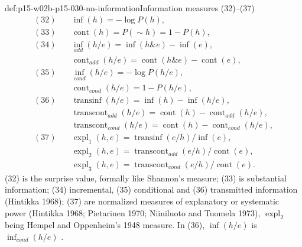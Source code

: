 \begin{hbdefinition}{def:p15-w02b-p15-030-nn-information}{Information measures (32)--(37)}
\[
\begin{aligned}
 (32)\quad&\operatorname{inf}(h)=-\log P(h),\\
 (33)\quad&\operatorname{cont}(h)=P(\sim h)=1-P(h),\\
 (34)\quad&\operatorname{inf}_{add}(h/e)=\operatorname{inf}(h\&e)-\operatorname{inf}(e),\\
          &\operatorname{cont}_{add}(h/e)=\operatorname{cont}(h\&e)-\operatorname{cont}(e),\\
 (35)\quad&\operatorname{inf}_{cond}(h/e)=-\log P(h/e),\\
          &\operatorname{cont}_{cond}(h/e)=1-P(h/e),\\
 (36)\quad&\operatorname{transinf}(h/e)=\operatorname{inf}(h)-\operatorname{inf}(h/e),\\
          &\operatorname{transcont}_{add}(h/e)=\operatorname{cont}(h)-\operatorname{cont}_{add}(h/e),\\
          &\operatorname{transcont}_{cond}(h/e)=\operatorname{cont}(h)-\operatorname{cont}_{cond}(h/e),\\
 (37)\quad&\operatorname{expl}_1(h,e)=\operatorname{transinf}(e/h)/\operatorname{inf}(e),\\
          &\operatorname{expl}_2(h,e)=\operatorname{transcont}_{add}(e/h)/\operatorname{cont}(e),\\
          &\operatorname{expl}_3(h,e)=\operatorname{transcont}_{cond}(e/h)/\operatorname{cont}(e).
\end{aligned}
\]
(32) is the surprise value, formally like Shannon's measure; (33) is
substantial information; (34) incremental, (35) conditional and (36)
transmitted information (Hintikka 1968); (37) are normalized measures of
explanatory or systematic power (Hintikka 1968; Pietarinen 1970;
Niiniluoto and Tuomela 1973), \(\operatorname{expl}_2\) being Hempel and
Oppenheim's 1948 measure. In (36), \(\operatorname{inf}(h/e)\) is
\(\operatorname{inf}_{cond}(h/e)\)
\cite[pp.~330--331]{Niiniluoto2011HintikkaProgramReading}.
\end{hbdefinition}

